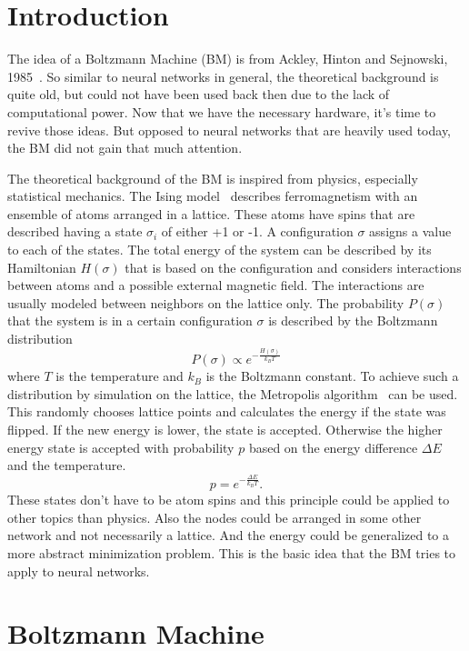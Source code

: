 \documentclass[12pt,twoside]{article}
\theoremstyle{plain}
\theoremstyle{definition}
\theoremstyle{remark}
\begin{document}
\section{Introduction}
\label{sec:intro}

The idea of a Boltzmann Machine (BM) is from Ackley, Hinton and Sejnowski, 1985~\cite{Ackley}. So similar to neural networks in general, the theoretical background is quite old, but could not have been used back then due to the lack of computational power. Now that we have the necessary hardware, it's time to revive those ideas. But opposed to neural networks that are heavily used today, the BM did not gain that much attention.

The theoretical background of the BM is inspired from physics, especially statistical mechanics. The Ising model~\cite{Ising} describes ferromagnetism with an ensemble of atoms arranged in a lattice. These atoms have spins that are described having a state $\sigma_i$ of either +1 or -1. A configuration $\sigma$ assigns a value to each of the states. The total energy of the system can be described by its Hamiltonian $H(\sigma)$ that is based on the configuration and considers interactions between atoms and a possible external magnetic field. The interactions are usually modeled between neighbors on the lattice only. The probability $P(\sigma)$ that the system is in a certain configuration $\sigma$ is described by the Boltzmann distribution
$$P(\sigma) \propto e^{-\frac{H(\sigma)}{k_BT}}$$
where $T$ is the temperature and $k_B$ is the Boltzmann constant. To achieve such a distribution by simulation on the lattice, the Metropolis algorithm~\cite{Metropolis} can be used. This randomly chooses lattice points and calculates the energy if the state was flipped. If the new energy is lower, the state is accepted. Otherwise the higher energy state is accepted with probability $p$ based on the energy difference $\Delta E$ and the temperature.
$$p = e^{-\frac{\Delta E}{k_BT}}.$$
These states don't have to be atom spins and this principle could be applied to other topics than physics. Also the nodes could be arranged in some other network and not necessarily a lattice. And the energy could be generalized to a more abstract minimization problem. This is the basic idea that the BM tries to apply to neural networks.


\section{Boltzmann Machine}
\label{sec:bm}
\end{document}
